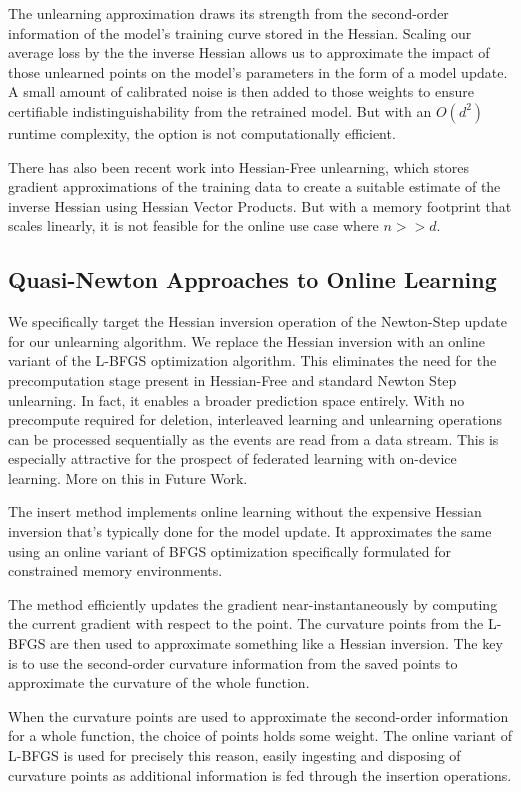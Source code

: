 \documentclass[a4paper,12pt]{article}
\begin{document}
The unlearning approximation draws its strength from the second-order information of the model's training curve stored in the Hessian. Scaling our average loss by the the inverse Hessian allows us to approximate the impact of those unlearned points on the model's parameters in the form of a model update. A small amount of calibrated noise is then added to those weights to ensure certifiable indistinguishability from the retrained model. But with an $O(d^{2})$ runtime complexity, the option is not computationally efficient.

There has also been recent work into Hessian-Free unlearning, which stores gradient approximations of the training data to create a suitable estimate of the inverse Hessian using Hessian Vector Products. But with a memory footprint that scales linearly, it is not feasible for the online use case where $n>>d$.

\subsection{Quasi-Newton Approaches to Online Learning}

We specifically target the Hessian inversion operation of the Newton-Step update for our unlearning algorithm. We replace the Hessian inversion with an online variant of the L-BFGS optimization algorithm. This eliminates the need for the precomputation stage present in Hessian-Free and standard Newton Step unlearning. In fact, it enables a broader prediction space entirely. With no precompute required for deletion, interleaved learning and unlearning operations can be processed sequentially as the events are read from a data stream. This is especially attractive for the prospect of federated learning with on-device learning. More on this in Future Work.

The insert method implements online learning without the expensive Hessian inversion that's typically done for the model update. It approximates the same using an online variant of BFGS optimization specifically formulated for constrained memory environments.

The method efficiently updates the gradient near-instantaneously by computing the current gradient with respect to the point. The curvature points from the L-BFGS are then used to approximate something like a Hessian inversion. The key is to use the second-order curvature information from the saved points to approximate the curvature of the whole function.

When the curvature points are used to approximate the second-order information for a whole function, the choice of points holds some weight. The online variant of L-BFGS is used for precisely this reason, easily ingesting and disposing of curvature points as additional information is fed through the insertion operations.
\end{document}
